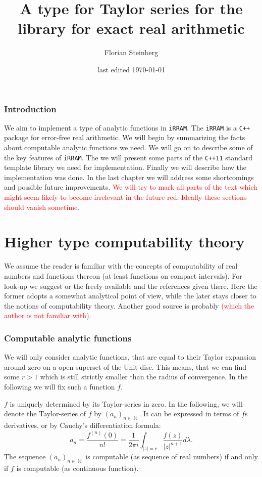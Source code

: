 \documentclass{article}
\title{A type for Taylor series for the \cc library \irram for exact real arithmetic}
\date{last edited \today}
\author{Florian Steinberg}
\DeclareMathOperator{\NN}{\ensuremath{\mathbb{N}}\xspace}
\newcommand{\irram}{\texttt{iRRAM}\xspace}
\newcommand{\cc}{\texttt{C++}\xspace}
\newcommand{\ccOx}{\texttt{C++11}\xspace}
\newcommand{\temp}[1]{\textcolor{red}{#1}}
\begin{document}
\maketitle
\newpage
\tableofcontents
\newpage
\section*{Introduction}

We aim to implement a type of analytic functions in \irram. The \irram is a \cc package for error-free real arithmetic. We will begin by summarizing the facts about computable analytic functions we need. We will go on to describe some of the key features of \irram. The we will present some parts of the \ccOx standard template library we need for implementation. Finally we will describe how the implementation was done. In the last chapter we will address some shortcomings and possible future improvements. \temp{We will try to mark all parts of the text which might seem likely to become irrelevant in the future red. Ideally these sections should vanish sometime.}

\part{Higher type computability theory}

We assume the reader is familiar with the concepts of computability of real numbers and functions thereon (at least functions on compact intervals). For look-up we suggest \cite{MR1005942} or the freely available \cite{MR2762094} and the references given there. Here the former adopts a somewhat analytical point of view, while the later stays closer to the notions of computability theory. Another good source is probably \cite{MR1795407} \temp{(which the author is not familiar with)}.

\section{Computable analytic functions}

We will only consider analytic functions, that are equal to their Taylor expansion around zero on a open superset of the Unit disc. This means, that we can find some $r>1$ which is still strictly smaller than the radius of convergence. In the following we will fix such a function $f$.

$f$ is uniquely determined by its Taylor-series in zero. In the following, we will denote the Taylor-series of $f$ by $(a_n)_{n\in \NN}$. It can be expressed in terms of $f$s derivatives, or by Cauchy's differentiation formula:
\[ a_n = \frac{f^{(n)}(0)}{n!} = \frac 1 {2\pi i}\int_{|z| = r} \frac{f(z)}{|z|^{n+1}} d\lambda. \]
The sequence $(a_n)_{n\in \NN}$ is computable (as sequence of real numbers) if and only if $f$ is computable (as continuous function). 
\end{document}
